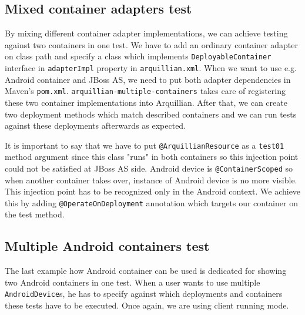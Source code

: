 \documentclass[12pt,final,oneside]{fithesis}
\begin{document}


		\subsection{Mixed container adapters test}

By mixing different container adapter implementations, we can achieve testing against two containers in one test. We have to add an ordinary container adapter on class path and specify a class which implements \texttt{DeployableContainer} interface in \texttt{adapterImpl} property in \linebreak \texttt{arquillian.xml}. When we want to use e.g. Android container and JBoss AS, we need to put both adapter dependencies in Maven's \texttt{pom.xml}. \texttt{arquillian\--multiple-containers} takes care of registering these two container implementations into Arquillian. After that, we can create two deployment methods which match described containers and we can run tests against these deployments afterwards as expected.


	
It is important to say that we have to put \texttt{@ArquillianResource} as a \texttt{test01} method argument since this class "runs" in both containers so this injection point could not be satisfied at JBoss AS side. Android device is \texttt{@ContainerScoped} so when another container takes over, instance of Android device is no more visible. This injection point has to be recognized only in the Android context. We achieve this by adding \texttt{@OperateOnDeployment} annotation which targets our container on the test method.

		\subsection{Multiple Android containers test}

The last example how Android container can be used is dedicated for showing two Android containers in one test. When a user wants to use multiple \texttt{AndroidDevice}s, he has to specify against which deployments and containers these tests have to be executed. Once again, we are using client running mode.  


\end{document}

